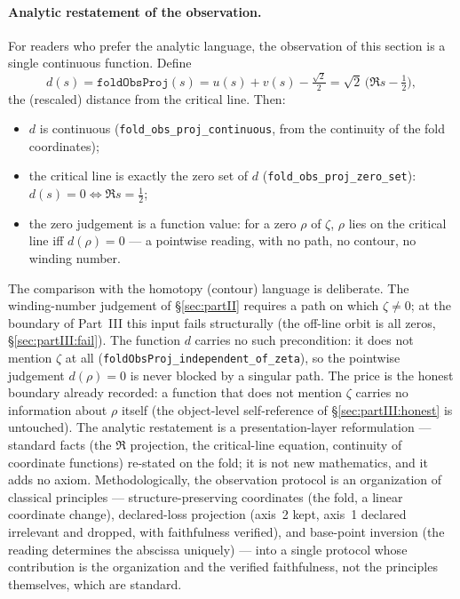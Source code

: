 \documentclass{article}
\newcommand{\zt}{\zeta}
\begin{document}
\paragraph{Analytic restatement of the observation.}
For readers who prefer the analytic language, the observation of this
section is a single continuous function. Define
\begin{equation}
  d(s)=\texttt{foldObsProj}(s)=u(s)+v(s)-\tfrac{\sqrt2}{2}
    =\sqrt2\,\bigl(\Re s-\tfrac12\bigr),
\end{equation}
the (rescaled) distance from the critical line. Then:
\begin{itemize}
\item $d$ is continuous (\texttt{fold\_obs\_proj\_continuous}, from the
  continuity of the fold coordinates);
\item the critical line is exactly the zero set of $d$
  (\texttt{fold\_obs\_proj\_zero\_set}): $d(s)=0\iff\Re s=\tfrac12$;
\item the zero judgement is a function value: for a zero $\rho$ of
  $\zt$, $\rho$ lies on the critical line iff $d(\rho)=0$ --- a
  pointwise reading, with no path, no contour, no winding number.
\end{itemize}
The comparison with the homotopy (contour) language is deliberate. The
winding-number judgement of \S\ref{sec:partII} requires a path on which
$\zt\ne 0$; at the boundary of Part~III this input fails structurally
(the off-line orbit is all zeros, \S\ref{sec:partIII:fail}). The
function $d$ carries no such precondition: it does not mention $\zt$
at all (\texttt{foldObsProj\_independent\_of\_zeta}), so the pointwise
judgement $d(\rho)=0$ is never blocked by a singular path. The price is
the honest boundary already recorded: a function that does not mention
$\zt$ carries no information about $\rho$ itself (the object-level
self-reference of \S\ref{sec:partIII:honest} is untouched). The
analytic restatement is a presentation-layer reformulation --- standard
facts (the $\Re$ projection, the critical-line equation, continuity of
coordinate functions) re-stated on the fold; it is not new mathematics,
and it adds no axiom. Methodologically, the observation protocol is an
organization of classical principles --- structure-preserving
coordinates (the fold, a linear coordinate change), declared-loss
projection (axis~2 kept, axis~1 declared irrelevant and dropped, with
faithfulness verified), and base-point inversion (the reading determines
the abscissa uniquely) --- into a single protocol whose contribution is
the organization and the verified faithfulness, not the principles
themselves, which are standard.
\end{document}
